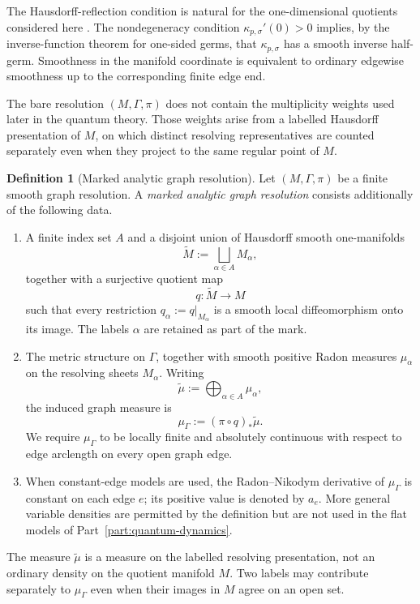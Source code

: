 \documentclass[11pt]{article}
\theoremstyle{plain}
\theoremstyle{definition}
\newtheorem{definition}[theorem]{Definition}
\begin{document}
The Hausdorff-reflection condition is natural for the
one-dimensional quotients considered here
\citep{HaefligerReeb1957,OConnell2023Adjunction,VlasenkoMaksymenko2026}.
The nondegeneracy condition \(\kappa_{p,\sigma}'(0)>0\) implies, by the inverse-function theorem for one-sided germs, that
\(\kappa_{p,\sigma}\) has a smooth inverse half-germ. Smoothness in the manifold coordinate is equivalent to ordinary
edgewise smoothness up to the corresponding finite edge end.

The bare resolution \((M,\Gamma,\pi)\) does not contain the multiplicity
weights used later in the quantum theory. Those weights arise from a labelled
Hausdorff presentation of \(M\), on which distinct resolving representatives
are counted separately even when they project to the same regular point of
\(M\).

\begin{definition}[Marked analytic graph resolution]
\label{def:marked-analytic-graph-resolution}
Let \((M,\Gamma,\pi)\) be a finite smooth graph resolution. A \emph{marked
analytic graph resolution} consists additionally of the following data.

\begin{enumerate}[label=\textup{(\roman*)}]
  \item A finite index set \(A\) and a disjoint union of Hausdorff smooth
        one-manifolds
        \[
          \widetilde M
          :=
          \bigsqcup_{\alpha\in A}M_\alpha,
        \]
        together with a surjective quotient map
        \[
          q:\widetilde M\longrightarrow M
        \]
        such that every restriction \(q_\alpha:=q|_{M_\alpha}\) is a smooth
        local diffeomorphism onto its image. The labels \(\alpha\) are retained
        as part of the mark.

  \item The metric structure on \(\Gamma\), together with smooth positive
        Radon measures \(\mu_\alpha\) on the resolving sheets \(M_\alpha\).
        Writing
        \[
          \widetilde\mu
          :=
          \bigoplus_{\alpha\in A}\mu_\alpha,
        \]
        the induced graph measure is
        \[
          \mu_\Gamma
          :=
          (\pi\circ q)_*\widetilde\mu.
        \]
        We require \(\mu_\Gamma\) to be locally finite and absolutely
        continuous with respect to edge arclength on every open graph edge.

  \item When constant-edge models are used, the Radon--Nikodym derivative of
        \(\mu_\Gamma\) is constant on each edge \(e\); its positive value is
        denoted by \(a_e\). More general variable densities are permitted by
        the definition but are not used in the flat models of Part~\ref{part:quantum-dynamics}.
\end{enumerate}

The measure \(\widetilde\mu\) is a measure on the labelled resolving
presentation, not an ordinary density on the quotient manifold \(M\). Two
labels may contribute separately to \(\mu_\Gamma\) even when their images in
\(M\) agree on an open set.
\end{definition}
\end{document}
